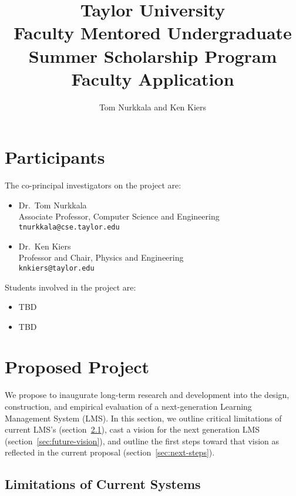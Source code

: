 \documentclass{article}
\title{Taylor University\\
  Faculty Mentored Undergraduate\\
  Summer Scholarship Program\\
  Faculty Application}
\author{Tom Nurkkala and Ken Kiers}
\begin{document}
\maketitle

\section{Participants}
\label{sec:participants}

The co-principal investigators on the project are:
\begin{itemize}
\item Dr.\ Tom Nurkkala\\
  Associate Professor, Computer Science and Engineering\\
  \texttt{tnurkkala@cse.taylor.edu}
\item Dr.\ Ken Kiers\\
  Professor and Chair, Physics and Engineering\\
  \texttt{knkiers@taylor.edu}
\end{itemize}

Students involved in the project are:
  \begin{itemize}
  \item TBD
  \item TBD
  \end{itemize}


\section{Proposed Project}
\label{sec:proposed-project}


We propose to inaugurate long-term research and development
into the design, construction, and empirical evaluation
of a next-generation Learning Management System (LMS).
In this section, we outline
critical limitations of current LMS's (section~\ref{sec:current-limitations}),
cast a vision for the next generation LMS (section~\ref{sec:future-vision}),
and outline the first steps toward that vision
as reflected in the current proposal (section~\ref{sec:next-steps}).

\subsection{Limitations of Current Systems}
\label{sec:current-limitations}
\end{document}
